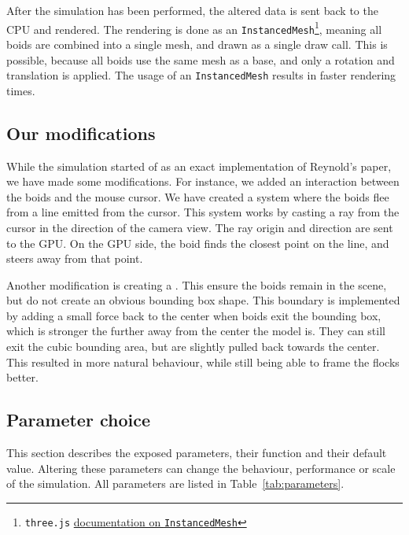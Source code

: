 \documentclass[a4paper, 12pt]{article}
\begin{document}
After the simulation has been performed, the altered data is sent back to the
CPU and rendered. The rendering is done as an \texttt{InstancedMesh}\footnote{\texttt{three.js} \href{https://threejs.org/docs/\#InstancedMesh}{documentation on \texttt{InstancedMesh}}}, meaning 
all boids are combined into a single mesh, and drawn as a single draw call.
This is possible, because all boids use the same mesh as a base, and only a
rotation and translation is applied. The usage of an \texttt{InstancedMesh} results in
faster rendering times.

\subsection{Our modifications}\label{subsec:modifications}
While the simulation started of as an exact implementation of Reynold's paper,
we have made some modifications. For instance, we added an interaction
between the boids and the mouse cursor. We have created a system where the boids flee from a
line emitted from the cursor. This system works by casting a ray from the
cursor in the direction of the camera view. The ray origin and direction are
sent to the GPU. On the GPU side, the boid finds the closest point on the line,
and steers away from that point.

Another modification is creating a . This ensure the boids remain
in the scene, but do not create an obvious bounding box shape. This boundary is implemented by adding a small force back to
the center when boids exit the bounding box, which is stronger the further away from the center the model is. They can still exit the cubic bounding area, but are slightly pulled back towards the center. This resulted in
more natural behaviour, while still being able to frame the flocks better.

\subsection{Parameter choice}\label{subsec:parameters}
This section describes the exposed parameters, their function and their default
value. Altering these parameters can change the behaviour, performance or scale
of the simulation. All parameters are listed in Table~\ref{tab:parameters}.
\end{document}
